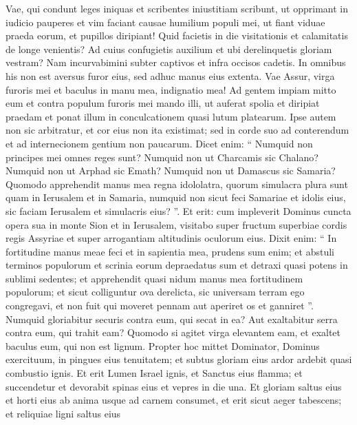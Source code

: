 \begin{biblechapter}
\begin{biblechapter}
\begin{biblechapter}
\begin{biblechapter}
\begin{biblechapter}
\begin{biblechapter}
\begin{biblechapter}
\begin{biblechapter}
\begin{biblechapter}
\begin{biblechapter}
\verse Vae, qui condunt leges iniquas
 et scribentes iniustitiam scribunt,
 \verse ut opprimant in iudicio pauperes
 et vim faciant causae humilium populi mei,
 ut fiant viduae praeda eorum,
 et pupillos diripiant!
 \verse Quid facietis in die visitationis
 et calamitatis de longe venientis?
 Ad cuius confugietis auxilium
 et ubi derelinquetis gloriam vestram?
 \verse Nam incurvabimini subter captivos
 et infra occisos cadetis.
 In omnibus his non est aversus furor eius,
 sed adhuc manus eius extenta.
 \verse Vae Assur, virga furoris mei
 et baculus in manu mea, indignatio mea!
 \verse Ad gentem impiam mitto eum
 et contra populum furoris mei mando illi,
 ut auferat spolia et diripiat praedam
 et ponat illum in conculcationem
 quasi lutum platearum.
 \verse Ipse autem non sic arbitratur,
 et cor eius non ita existimat;
 sed in corde suo ad conterendum
 et ad internecionem gentium non paucarum.
 \verse Dicet enim: “ Numquid non principes mei omnes reges sunt?
 \verse Numquid non ut Charcamis sic Chalano?
 Numquid non ut Arphad sic Emath?
 Numquid non ut Damascus sic Samaria?
 \verse Quomodo apprehendit manus mea regna idololatra,
 quorum simulacra plura sunt quam in Ierusalem et in Samaria,
 \verse numquid non sicut feci Samariae et idolis eius,
 sic faciam Ierusalem et simulacris eius? ”.
 \verse Et erit: cum impleverit Dominus cuncta opera sua in monte Sion et in Ierusalem, visitabo super fructum superbiae cordis regis Assyriae et super arrogantiam altitudinis oculorum eius. 
\verse Dixit enim:
 “ In fortitudine manus meae feci
 et in sapientia mea, prudens sum enim;
 et abstuli terminos populorum
 et scrinia eorum depraedatus sum
 et detraxi quasi potens in sublimi sedentes;
 \verse et apprehendit quasi nidum manus mea fortitudinem populorum;
 et sicut colliguntur ova derelicta,
 sic universam terram ego congregavi,
 et non fuit qui moveret pennam aut aperiret os et ganniret ”.
 \verse Numquid gloriabitur securis
 contra eum, qui secat in ea?
 Aut exaltabitur serra
 contra eum, qui trahit eam?
 Quomodo si agitet virga elevantem eam,
 et exaltet baculus eum, qui non est lignum.
 \verse Propter hoc mittet Dominator, Dominus exercituum,
 in pingues eius tenuitatem;
 et subtus gloriam eius
 ardor ardebit quasi combustio ignis.
 \verse Et erit Lumen Israel ignis,
 et Sanctus eius flamma;
 et succendetur et devorabit spinas eius
 et vepres in die una.
 \verse Et gloriam saltus eius et horti eius
 ab anima usque ad carnem consumet,
 et erit sicut aeger tabescens;
 \verse et reliquiae ligni saltus eius

\end{biblechapter}
\end{biblechapter}
\end{biblechapter}
\end{biblechapter}
\end{biblechapter}
\end{biblechapter}
\end{biblechapter}
\end{biblechapter}
\end{biblechapter}
\end{biblechapter}
